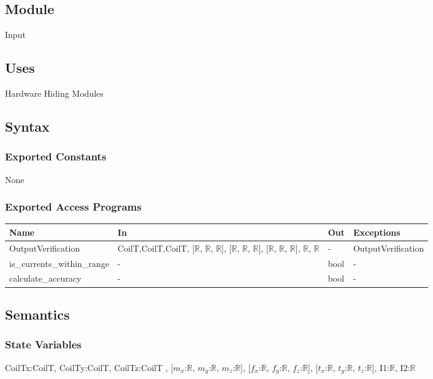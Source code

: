 \documentclass[12pt, titlepage]{article}
\begin{document}
\subsection{Module}
Input

\subsection{Uses}
Hardware Hiding Modules

\subsection{Syntax}

\subsubsection{Exported Constants}
None
\subsubsection{Exported Access Programs}

\begin{center}
\begin{tabular}{p{4cm} p{3cm} p{4cm} p{2cm}}
\hline
\textbf{Name} & \textbf{In} & \textbf{Out} & \textbf{Exceptions} \\
\hline
OutputVerification & CoilT,CoilT,CoilT, [$\mathbb{R}$, $\mathbb{R}$, $\mathbb{R}$], [$\mathbb{R}$, $\mathbb{R}$, $\mathbb{R}$], [$\mathbb{R}$, $\mathbb{R}$, $\mathbb{R}$], $\mathbb{R}$, $\mathbb{R}$ & - & OutputVerification  \\
\hline
is\_currents\_within\_range & - & bool & -  \\
\hline

calculate\_accuracy & - & bool & -  \\
\hline
\end{tabular}
\end{center}

\subsection{Semantics}

\subsubsection{State Variables}
CoilTx:CoilT,  CoilTy:CoilT,  CoilTz:CoilT , [$m_x$:$\mathbb{R}$, $m_y$:$\mathbb{R}$, $m_z$:$\mathbb{R}$], [$f_x$:$\mathbb{R}$, $f_y$:$\mathbb{R}$, $f_z$:$\mathbb{R}$], [$t_x$:$\mathbb{R}$, $t_y$:$\mathbb{R}$, $t_z$:$\mathbb{R}$], I1:$\mathbb{R}$, I2:$\mathbb{R}$
\end{document}
